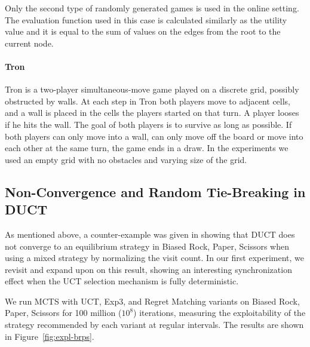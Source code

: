 Only the second type of randomly generated games is used in the online setting. 
The evaluation function used in this case is calculated similarly as the utility value and it is equal to the sum of values on the edges from the root to the current node.

\paragraph{\textbf{Tron}} 
Tron is a two-player simultaneous-move game played on a discrete grid, possibly obstructed by walls. 
At each step in Tron both players move to adjacent cells, and a wall is placed in the cells the players started on that turn.
A player looses if he hits the wall.
The goal of both players is to survive as long as possible. 
If both players can only move into a wall, can only move off the board or move into each other at the same turn, the game ends in a draw. 
In the experiments we used an empty grid with no obstacles and varying size of the grid.


\subsection{Non-Convergence and Random Tie-Breaking in DUCT}\label{sec:exp:brps} 

As mentioned above, a counter-example was given in \cite{Shafiei09} showing that 
DUCT does not converge to an equilibrium strategy in Biased Rock, Paper, Scissors 
when using a mixed strategy by normalizing the visit count.
In our first experiment, we revisit and expand upon on this result, showing an interesting 
synchronization effect when the UCT selection mechanism is fully deterministic.

We run MCTS with UCT, Exp3, and Regret Matching variants on Biased Rock, Paper, Scissors
for 100 million ($10^8$) iterations, measuring the exploitability of the strategy recommended by 
each variant at regular intervals. The results are shown in Figure~\ref{fig:expl-brps}.

